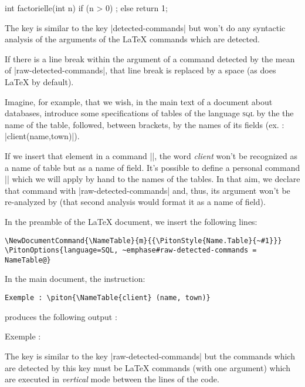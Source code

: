 \documentclass{article}
\begin{document}
\begin{Piton}[language=C]
int factorielle(int n)
  {
    if (n > 0)  ;
    else return 1;
  }
\end{Piton}

\bigskip
The key  is similar to the key
|detected-commands| but  won't do any syntactic analysis of the
arguments of the LaTeX commands which are detected.

If there is a line break within the argument of a command detected by the mean
of |raw-detected-commands|, that line break is replaced by a space (as does
LaTeX by default).

\medskip
Imagine, for example, that we wish, in the main text of a document about
databases, introduce some specifications of tables of the language
\textsc{sql} by the the name of the table, followed, between brackets, by the
names of its fields (ex. : |client(name,town)|).

If we insert that element in a command |\piton|, the word \emph{client} won't
be recognized as a name of table but as a name of field. It's possible to
define a personal command |\NomTable| which we will apply by hand to the names
of the tables. In that aim, we declare that command with
|raw-detected-commands| and, thus, its argument won't be re-analyzed by
 (that second analysis would format it as a name of field).

\medskip
In the preamble of the LaTeX document, we insert the following lines:

\begin{Verbatim}
\NewDocumentCommand{\NameTable}{m}{{\PitonStyle{Name.Table}{~#1}}}
\PitonOptions{language=SQL, ~emphase#raw-detected-commands = NameTable@}
\end{Verbatim}

In the main document, the instruction:

\begin{Verbatim}
Exemple : \piton{\NameTable{client} (name, town)}
\end{Verbatim}


produces the following output :

\smallskip
\begingroup
{}%
Exemple : 
\endgroup

\bigskip
The key  is similar to the key |raw-detected-commands|
but the commands which are detected by this key must be LaTeX commands (with one argument)
which are executed in \emph{vertical} mode between the lines of the code.
\end{document}
